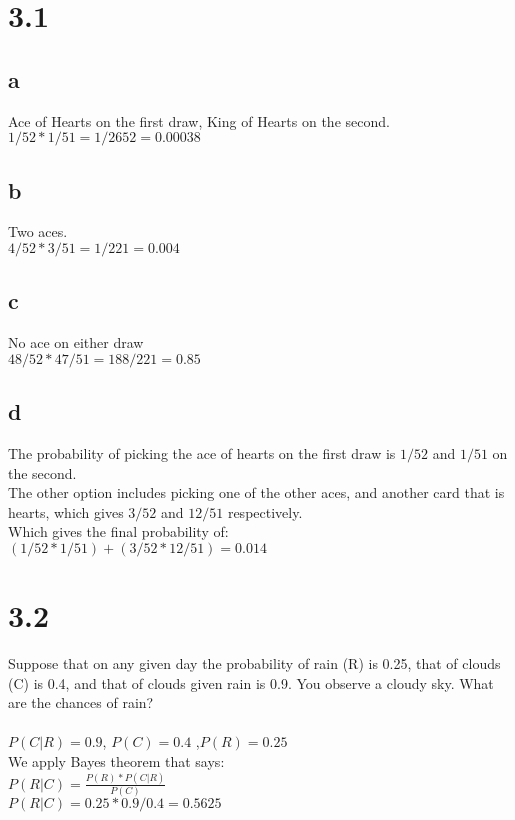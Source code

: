 \documentclass{article}
\begin{document}
\section*{3.1}
\subsection*{a}
Ace of Hearts on the first draw, King of Hearts on the second. \\
$1/52 * 1/51 = 1/2652 = 0.00038 $ \\
\subsection*{b}
Two aces.\\
$4/52 * 3/51 = 1/221 = 0.004 $ \\
\subsection*{c}
No ace on either draw \\
$48/52 * 47/51 = 188/221 = 0.85$ \\
\subsection*{d}
The probability of picking the ace of hearts on the first draw is $1/52$ and $1/51$ on the second. \\
The other option includes picking one of the other aces, and another card that is hearts, which gives $3/52$ and $12/51$ respectively. \\
Which gives the final probability of: \\
$(1/52*1/51)+(3/52*12/51) = 0.014$

\section*{3.2 }
Suppose that on any given day the probability of rain (R) is 0.25, that of clouds (C) is 0.4, and that of clouds given rain is 0.9. You observe a cloudy sky. What are the chances of rain? \\ \\
$P(C|R) = 0.9$, $P(C) = 0.4$ ,$P(R) = 0.25$ \\
We apply Bayes theorem that says: \\
$P(R|C) = \frac{P(R)*P(C|R)}{  P(C)} $ \\
$P(R|C) = 0.25*0.9 / 0.4 = 0.5625$ \\
\end{document}
